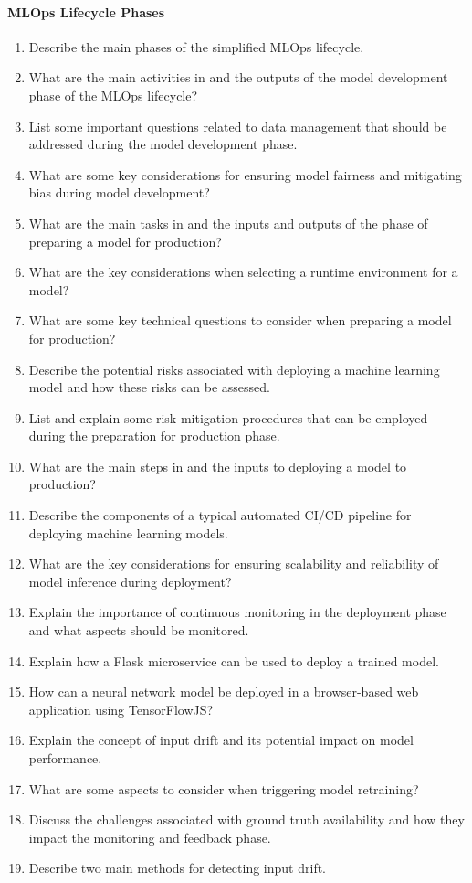 \paragraph*{MLOps Lifecycle Phases}
\begin{enumerate}
    \item Describe the main phases of the simplified MLOps lifecycle.

    \item What are the main activities in and the outputs of the model development phase of the MLOps lifecycle?
    \item List some important questions related to data management that should be addressed during the model development phase.
    \item What are some key considerations for ensuring model fairness and mitigating bias during model development?

    \item What are the main tasks in and the inputs and outputs of the phase of preparing a model for production?
    \item What are the key considerations when selecting a runtime environment for a model?
    \item What are some key technical questions to consider when preparing a model for production?
    \item Describe the potential risks associated with deploying a machine learning model and how these risks can be assessed.
    \item List and explain some risk mitigation procedures that can be employed during the preparation for production phase.

    \item What are the main steps in and the inputs to deploying a model to production?
    \item Describe the components of a typical automated CI/CD pipeline for deploying machine learning models.
    \item What are the key considerations for ensuring scalability and reliability of model inference during deployment?
    \item Explain the importance of continuous monitoring in the deployment phase and what aspects should be monitored.
    \item Explain how a Flask microservice can be used to deploy a trained model.
    \item How can a neural network model be deployed in a browser-based web application using TensorFlowJS?

    \item Explain the concept of input drift and its potential impact on model performance.
    \item What are some aspects to consider when triggering model retraining?
    \item Discuss the challenges associated with ground truth availability and how they impact the monitoring and feedback phase.
    \item Describe two main methods for detecting input drift.
\end{enumerate}
